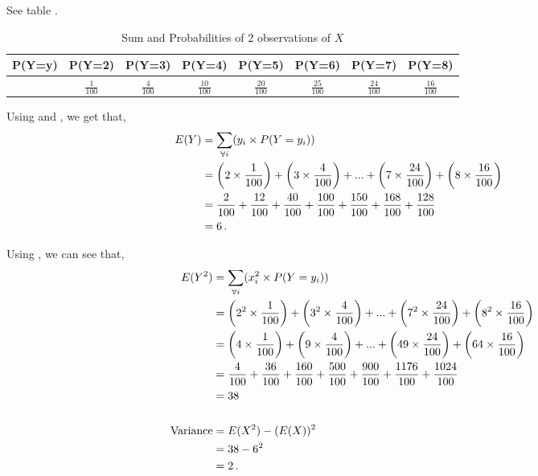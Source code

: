 \begin{subquestions}
\begin{subsubquestions}

\subsubquestion

See table .

\begin{table}[H]
	\centering
	\begin{tabular}{|c|c|c|c|c|c|c|c|}
		\hline
		P(Y=y) & P(Y=2) &P(Y=3) &P(Y=4) &P(Y=5) &P(Y=6) &P(Y=7) &P(Y=8) \\
		\hline 
		 & $\frac{1}{100}$  &
		 $\frac{4}{100}$  &
		 $\frac{10}{100}$ & 
		 $\frac{20}{100}$  &
		 $\frac{25}{100}$   &
		 $\frac{24}{100}$  &
		$\frac{16}{100}$  \\
		\hline
	\end{tabular}
	\caption{\label{2008J:q4:Ytab2} Sum and Probabilities of 2 observations of $X$}	
\end{table}


\subsubquestion

Using  and , we get that,
\begin{align} \hspace{-70pt}
	E(Y)  & = \sum_{\forall i} (y_i \times P(Y=y_i)) \nn \\
	      & = \left(2 \times \frac{1}{100}\right) + \left(3 \times \frac{4}{100}\right) + ... +  \left(7 \times \frac{24}{100}\right) + \left(8 \times \frac{16}{100}\right) \nn \\
	      & = \frac{2}{100}+ \frac{12}{100}+ \frac{40}{100}+ \frac{100}{100}+ \frac{150}{100}+ \frac{168}{100}+ \frac{128}{100} \nn \\
	      & = 6 \,.
\end{align}

Using , we can see that,
\begin{align}
	E(Y^2) & = \sum_{\forall i}(x_i^2 \times P(Y=y_i)) \nonumber \\
		   & = \left(2^2 \times \frac{1}{100}\right) + \left(3^2 \times \frac{4}{100}\right) + ... +  \left(7^2 \times \frac{24}{100}\right) + \left(8^2 \times \frac{16}{100}\right) \nonumber \\
		   & = \left(4 \times \frac{1}{100}\right) + \left(9 \times \frac{4}{100}\right) + ... +  \left(49 \times \frac{24}{100}\right) + \left(64 \times \frac{16}{100}\right) \nonumber \\
		   &= \frac{4}{100}+\frac{36}{100}+\frac{160}{100}+\frac{500}{100}+\frac{900}{100}+\frac{1176}{100}+\frac{1024}{100} \nonumber \\
		   & = 38 \, \\ \nonumber \\
	\text{Variance} & = E(X^2) - (E(X))^2  \nonumber \\
	           & = 38 - 6^2 \nonumber \\
	           & = 2 \,.
\end{align}


\end{subsubquestions}
\end{subquestions}
